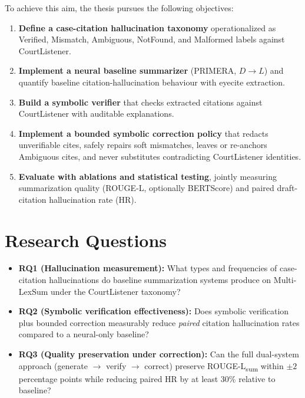 To achieve this aim, the thesis pursues the following objectives:
\begin{enumerate}
  \item \textbf{Define a case-citation hallucination taxonomy} operationalized as Verified, Mismatch, Ambiguous, NotFound, and Malformed labels against CourtListener.
  \item \textbf{Implement a neural baseline summarizer} (PRIMERA, $D\rightarrow L$) and quantify baseline citation-hallucination behaviour with eyecite extraction.
  \item \textbf{Build a symbolic verifier} that checks extracted citations against CourtListener \cite{courtlistener_api} with auditable explanations.
  \item \textbf{Implement a bounded symbolic correction policy} that redacts unverifiable cites, safely repairs soft mismatches, leaves or re-anchors Ambiguous cites, and never substitutes contradicting CourtListener identities.
  \item \textbf{Evaluate with ablations and statistical testing}, jointly measuring summarization quality (ROUGE-L, optionally BERTScore) and paired draft-citation hallucination rate (HR).
\end{enumerate}

\section{Research Questions}

\begin{itemize}
  \item \textbf{RQ1 (Hallucination measurement):} What types and frequencies of case-citation hallucinations do baseline summarization systems produce on Multi-LexSum under the CourtListener taxonomy?
  \item \textbf{RQ2 (Symbolic verification effectiveness):} Does symbolic verification plus bounded correction measurably reduce \emph{paired} citation hallucination rates compared to a neural-only baseline?
  \item \textbf{RQ3 (Quality preservation under correction):} Can the full dual-system approach (generate $\rightarrow$ verify $\rightarrow$ correct) preserve ROUGE-L\textsubscript{sum} within $\pm 2$ percentage points while reducing paired HR by at least 30\% relative to baseline?
\end{itemize}

